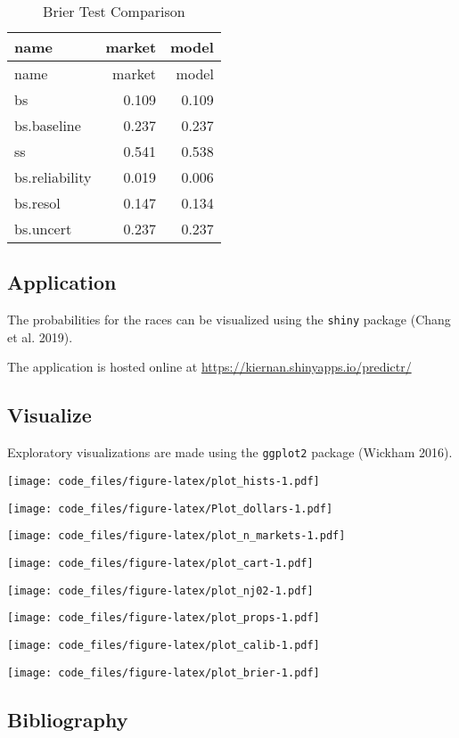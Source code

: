 \documentclass[]{article}
\begin{document}
\begin{longtable}[]{@{}lrr@{}}
\caption{Brier Test Comparison}\tabularnewline
\toprule
name & market & model\tabularnewline
\midrule
\endfirsthead
\toprule
name & market & model\tabularnewline
\midrule
\endhead
bs & 0.109 & 0.109\tabularnewline
bs.baseline & 0.237 & 0.237\tabularnewline
ss & 0.541 & 0.538\tabularnewline
bs.reliability & 0.019 & 0.006\tabularnewline
bs.resol & 0.147 & 0.134\tabularnewline
bs.uncert & 0.237 & 0.237\tabularnewline
\bottomrule
\end{longtable}

\hypertarget{application}{%
\subsection{Application}\label{application}}

The probabilities for the races can be visualized using the
\texttt{shiny} package (Chang et al. 2019).

The application is hosted online at
\url{https://kiernan.shinyapps.io/predictr/}

\hypertarget{visualize}{%
\subsection{Visualize}\label{visualize}}

Exploratory visualizations are made using the \texttt{ggplot2} package
(Wickham 2016).

\texttt{[image: code\_files/figure-latex/plot\_hists-1.pdf]}

\texttt{[image: code\_files/figure-latex/Plot\_dollars-1.pdf]}

\texttt{[image: code\_files/figure-latex/plot\_n\_markets-1.pdf]}

\texttt{[image: code\_files/figure-latex/plot\_cart-1.pdf]}

\texttt{[image: code\_files/figure-latex/plot\_nj02-1.pdf]}

\texttt{[image: code\_files/figure-latex/plot\_props-1.pdf]}

\texttt{[image: code\_files/figure-latex/plot\_calib-1.pdf]}

\texttt{[image: code\_files/figure-latex/plot\_brier-1.pdf]}

\hypertarget{bibliography}{%
\subsection*{Bibliography}\label{bibliography}}
\end{document}
